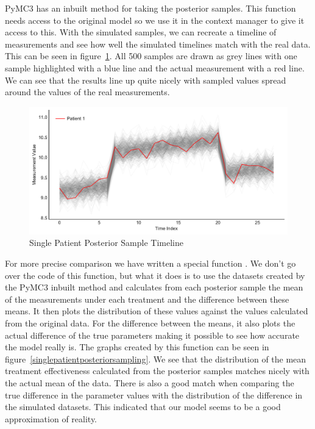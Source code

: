 \documentclass[12pt,a4paper,leqno]{report}
\theoremstyle{plain}
\theoremstyle{definition}
\theoremstyle{remark}
\begin{document}
PyMC3 has an inbuilt method for taking the posterior samples. This function needs access
to the original model so we use it in the context manager
to give it access to this. With the simulated samples, we can recreate a timeline of
measurements and see how well the simulated timelines match with the real data.
This can be seen in figure\ \ref{singlepatientposteriortimeline}.
All 500 samples are drawn as grey lines with one sample highlighted with a blue line and
the actual measurement with a red line. We can see that the results line up quite
nicely with sampled values spread around the values of the real measurements.

\bigskip
\begin{figure}[H]
    \caption{Single Patient Posterior Sample Timeline}\label{singlepatientposteriortimeline}
    \bigskip
    \includegraphics[width=\textwidth,height=\textheight,keepaspectratio]{posterior_sample_timeline_single_patient.pdf}
\end{figure}
\bigskip

For more precise comparison we have written a special function
. We don't go over the code of this function,
but what it does is to use the datasets created by the PyMC3 inbuilt method and
calculates from each posterior sample the mean of the measurements under each treatment and the difference between
these means. It then plots the distribution of these values
against the values calculated from the
original data. For the difference between the means, it also plots the actual
difference of the true parameters making it possible to see how accurate the model really
is. The graphs created by this function can be seen in figure\
\ref{singlepatientposteriorsampling}.
We see that the distribution of the mean treatment effectiveness calculated from the
posterior samples matches nicely with the actual mean of the data. There is also a good
match when comparing the true difference in the parameter values with the distribution of
the difference in the simulated datasets. This indicated that our
model seems to be a good approximation of reality.
\end{document}
